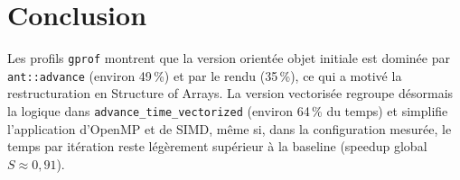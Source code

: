 \documentclass[12pt,a4paper]{article}
\begin{document}
\section{Conclusion}
\label{sec:conclusion}

Les profils \texttt{gprof} montrent que la version orientée objet initiale est dominée par \texttt{ant::advance} (environ 49\,\%) et par le rendu (35\,\%), ce qui a motivé la restructuration en Structure of Arrays. La version vectorisée regroupe désormais la logique dans \texttt{advance\_time\_vectorized} (environ 64\,\% du temps) et simplifie l'application d'OpenMP et de SIMD, même si, dans la configuration mesurée, le temps par itération reste légèrement supérieur à la baseline (speedup global $S \approx 0{,}91$).
\end{document}
